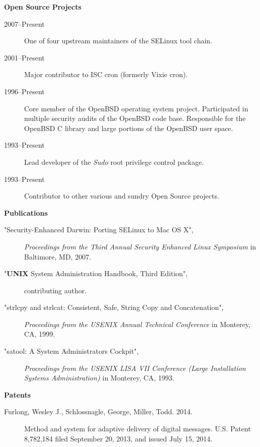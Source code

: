 \documentclass[letterpaper,11pt]{article}
\newcommand{\resheading}[1]{{\large \colorbox{mygrey}{\begin{minipage}{\textwidth}{\textbf{#1 \vphantom{p\^{E}}}}\end{minipage}}}}
\begin{document}
\resheading{Open Source Projects}

\begin{description}
\item[2007--Present] One of four upstream maintainers of the SELinux tool chain.
\item[2001--Present] Major contributor to ISC cron (formerly Vixie cron).
\item[1996--Present] Core member of the OpenBSD operating system project.  Participated in multiple security audits of the OpenBSD code base.  Responsible for the OpenBSD C library and large portions of the OpenBSD user space.
\item[1993--Present] Lead developer of the \emph{Sudo} root privilege control package.
\item[1993--Present] Contributor to other various and sundry Open Source projects.
\end{description}

\resheading{Publications}

\begin{description}
\item["Security-Enhanced Darwin: Porting SELinux to Mac OS X",]
\emph{Proceedings from the Third Annual Security Enhanced Linux Symposium} in Baltimore, MD, 2007.
\item["{\sc \bf UNIX} System Administration Handbook, Third Edition",]
contributing author.
\item["strlcpy and strlcat:  Consistent, Safe, String Copy and Concatenation",]
\emph{Proceedings from the USENIX Annual Technical Conference} in Monterey, CA, 1999.
\item["satool:  A System Administrators Cockpit",]
\emph{Proceedings from the USENIX LISA VII Conference (Large Installation Systems Administration)} in Monterey, CA, 1993.
\end{description}

\resheading{Patents}

\begin{description}
\item[Furlong, Wesley J., Schlossnagle, George, Miller, Todd.  2014.]
Method and system for adaptive delivery of digital messages.
U.S. Patent 8,782,184 filed September 20, 2013, and issued July 15, 2014.
\end{description}
\end{document}
